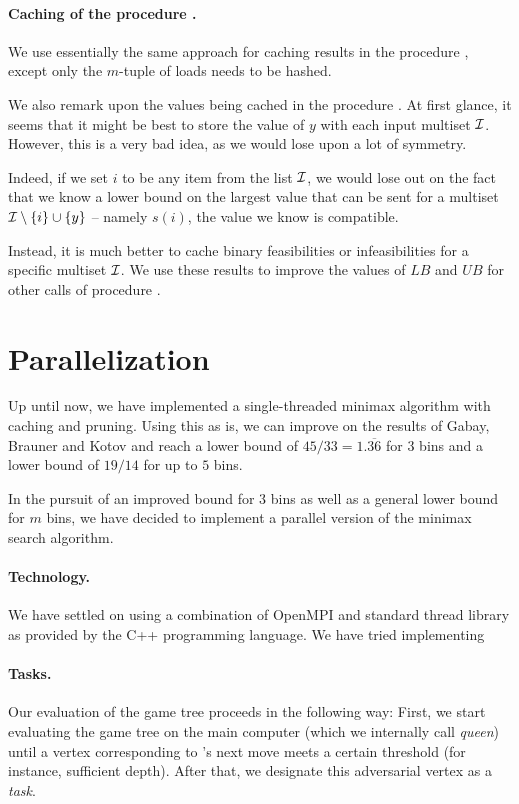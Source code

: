 \paragraph{Caching of the procedure \MaxFeas.} We use essentially the
same approach for caching results in the procedure \MaxFeas, except
only the $m$-tuple of loads needs to be hashed.

We also remark upon the values being cached in the procedure \MaxFeas.
At first glance, it seems that it might be best to store the value of
$y$ with each input multiset ${\mathcal I}$. However, this is a very bad
idea, as we would lose upon a lot of symmetry.

Indeed, if we set $i$ to be any item from the list ${\mathcal I}$, we would
lose out on the fact that we know a lower bound on the largest value
that can be sent for a multiset ${\mathcal I} \setminus \{i\} \cup \{y\}$ --
namely $s(i)$, the value we know is compatible.

Instead, it is much better to cache binary feasibilities or
infeasibilities for a specific multiset ${\mathcal I}$. We use these results
to improve the values of $LB$ and $UB$ for other calls of procedure
\MaxFeas.

\section{Parallelization}\label{subsec:para}

Up until now, we have implemented a single-threaded minimax algorithm
with caching and pruning. Using this as is, we can improve on the
results of Gabay, Brauner and Kotov \cite{gabay2013lbv2} and reach a
lower bound of $45/33 = 1.\overline{36}$ for $3$ bins and a lower
bound of $19/14$ for up to $5$ bins.

In the pursuit of an improved bound for $3$ bins as well as a general
lower bound for $m$ bins, we have decided to implement a parallel
version of the minimax search algorithm.

\paragraph{Technology.} We have settled on using a combination
of OpenMPI \cite{openmpi} and standard thread library as provided
by the C++ programming language. We have tried implementing


\paragraph{Tasks.} Our evaluation of the game tree proceeds in the
following way: First, we start evaluating the game tree on the main
computer (which we internally call \emph{queen}) until a vertex
corresponding to \adversary's next move meets a certain threshold (for
instance, sufficient depth). After that, we designate this adversarial
vertex as a \emph{task}.

